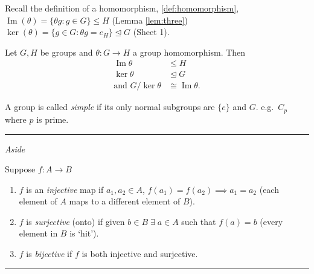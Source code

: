Recall the definition of a homomorphism, \ref{def:homomorphism}, \(\operatorname{Im}(\theta) = \{ \theta g : g \in G \} \leq H\) (Lemma \ref{lem:three})\\
\(\ker(\theta) = \{ g \in G : \theta g = e_H \} \trianglelefteq G\) (Sheet 1).

\begin{theorem}
\protect\hypertarget{thm:six}{}\label{thm:six}Let \(G, H\) be groups and \(\theta : G \to H\) a group homomorphism.
Then \begin{align*}
    \operatorname{Im} \theta &\leq H \\
    \ker \theta &\trianglelefteq G \\
    \text{and } G / \ker \theta &\cong \operatorname{Im} \theta.
\end{align*}
\end{theorem}

\begin{definition}
\protect\hypertarget{def:sixteen}{}\label{def:sixteen}A group is called \emph{simple} if its only normal subgroups are \(\{ e \}\) and \(G\).
e.g.~\(C_p\) where \(p\) is prime.
\end{definition}

\begin{center}\rule{0.5\linewidth}{0.5pt}\end{center}

\emph{Aside}

\begin{definition}

Suppose \(f : A \to B\)

\begin{enumerate}
\def\labelenumi{\roman{enumi}.}
\item
  \(f\) is an \emph{injective} map if \(a_1, a_2 \in A\), \(f(a_1) = f(a_2) \implies a_1 = a_2\) (each element of \(A\) maps to a different element of \(B\)).
\item
  \(f\) is \emph{surjective} (onto) if given \(b \in B \; \exists \; a \in A\) such that \(f(a) = b\) (every element in \(B\) is `hit').
\item
  \(f\) is \emph{bijective} if \(f\) is both injective and surjective.
\end{enumerate}

\end{definition}

\begin{center}\rule{0.5\linewidth}{0.5pt}\end{center}

